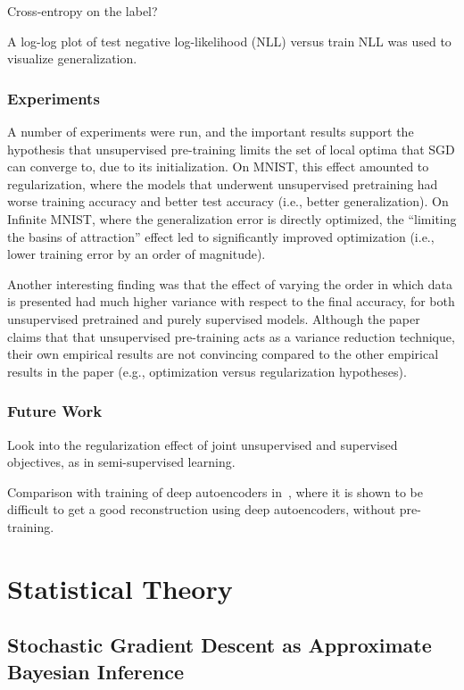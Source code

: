 \documentclass[a4paper, 12pt]{article}
\begin{document}
Cross-entropy on the label?

A log-log plot of test negative log-likelihood (NLL) versus train NLL was used
to visualize generalization.


\subsubsection{Experiments}

A number of experiments were run, and the important results support the
hypothesis that unsupervised pre-training limits the set of local optima that
SGD can converge to, due to its initialization. On MNIST, this effect amounted
to regularization, where the models that underwent unsupervised pretraining had
worse training accuracy and better test accuracy (i.e., better generalization).
On Infinite MNIST, where the generalization error is directly optimized, the
``limiting the basins of attraction'' effect led to significantly improved
optimization (i.e., lower training error by an order of magnitude).

Another interesting finding was that the effect of varying the order in which
data is presented had much higher variance with respect to the final accuracy,
for both unsupervised pretrained and purely supervised models. Although the
paper claims that that unsupervised pre-training acts as a variance reduction
technique, their own empirical results are not convincing compared to the other
empirical results in the paper (e.g., optimization versus regularization
hypotheses).


\subsubsection{Future Work}

Look into the regularization effect of joint unsupervised and supervised
objectives, as in semi-supervised learning.

Comparison with training of deep autoencoders in~\citet{HinSal06}, where it is
shown to be difficult to get a good reconstruction using deep autoencoders,
without pre-training.


\section{Statistical Theory}

\subsection{Stochastic Gradient Descent as Approximate Bayesian
            Inference~\citet{mandt-sgd-2017}}
\end{document}
